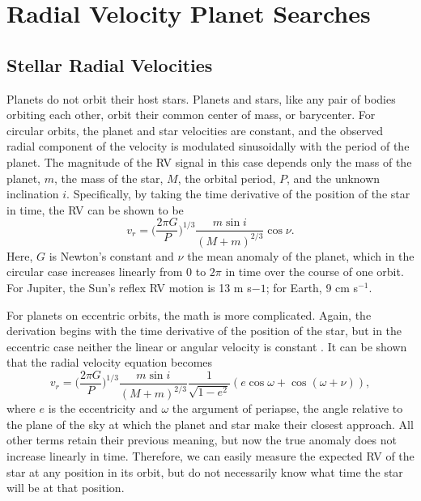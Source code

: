 \documentclass[12pt]{caltech_thesis}
\begin{document}
\section{Radial Velocity Planet Searches}
\subsection{Stellar Radial Velocities}
Planets do not orbit their host stars.
Planets and stars, like any pair of bodies orbiting each other, orbit their common
center of mass, or barycenter.
For circular orbits, the planet and star velocities are constant, and the observed
radial component of the velocity is modulated sinusoidally with the period of the planet.
The magnitude of the RV signal in this case depends only the mass of the planet, $m$, 
the mass of the star, $M$, the orbital period, $P$, and the unknown inclination $i$.
Specifically, by taking the time derivative of the position of the star in time,
the RV can be shown to be
\begin{equation}
v_r = \bigg(\frac{2\pi G}{P}\bigg)^{1/3} \frac{m \sin i}{(M+m)^{2/3}} \cos{\nu}.
\end{equation}
Here, $G$ is Newton's constant and $\nu$ the mean anomaly of the planet, which in the circular case increases
linearly from $0$ to $2\pi$ in time over the course of one orbit.
For Jupiter, the Sun's reflex RV motion is 13 m s${-1}$; for Earth, 9 cm s$^{-1}$.

For planets on eccentric orbits, the math is more complicated.
Again, the derivation begins with the time derivative of the position of the star, but
in the eccentric case neither the linear or angular velocity is constant \citep{Kepler09}.
It can be shown that the radial velocity equation becomes
\begin{equation}
v_r = \bigg(\frac{2\pi G}{P}\bigg)^{1/3} \frac{m \sin i}{(M+m)^{2/3}} \frac{1}{\sqrt{1-e^2}}
(e \cos \omega + \cos(\omega + \nu)),
\label{eq:rv}
\end{equation}
where $e$ is the eccentricity and $\omega$ the argument of periapse, the angle relative
to the plane of the sky at which the planet and star make their closest approach.
All other terms retain their previous meaning, but now the true anomaly does not 
increase linearly in time.
Therefore, we can easily measure the expected RV of the star at any position in its 
orbit, but do not necessarily know what time the star will be at that position.
\end{document}
